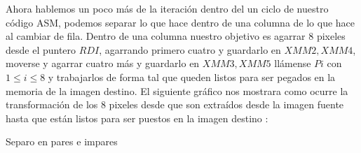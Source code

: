 Ahora hablemos un poco más de la iteración dentro del un ciclo de nuestro código ASM, podemos separar lo que hace dentro de una columna de lo que hace al cambiar de fila. Dentro de una columna nuestro objetivo es agarrar 8 pixeles desde el puntero $RDI$, agarrando primero cuatro y guardarlo en $XMM2, XMM4$, moverse y agarrar cuatro más y guardarlo en $XMM3, XMM5$ llámense $Pi$ con $1\leq i\leq 8$ y trabajarlos de forma tal que queden listos para ser pegados en la memoria de la imagen destino. El siguiente gráfico nos mostrara como ocurre la transformación de los 8 pixeles desde que son extraídos desde la imagen fuente hasta que están listos para ser puestos en la imagen destino : 

\begin{center}
\end{center}

Separo en pares e impares

